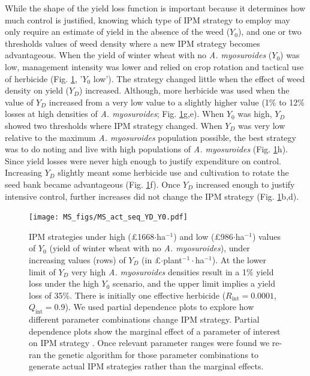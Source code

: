 \documentclass[12pt, a4paper]{article}
\begin{document}
While the shape of the yield loss function is important because it determines how much control is justified, knowing which type of IPM strategy to employ may only require an estimate of yield in the absence of the weed ($Y_0$), and one or two thresholds values of weed density where a new IPM strategy becomes advantageous. When the yield of winter wheat with no \textit{A. myosuroides} ($Y_0$) was low, management intensity was lower and relied on crop rotation and tactical use of herbicide (Fig. \ref{fig:Y0_YD}, '$Y_0$ low'). The strategy changed little when the effect of weed density on yield ($Y_D$) increased. Although, more herbicide was used when the value of $Y_D$ increased from a very low value to a slightly higher value (1\% to 12\% losses at high densities of \textit{A. myosuroides}; Fig. \ref{fig:Y0_YD}g,e). When $Y_0$ was high, $Y_D$ showed two thresholds where IPM strategy changed. When $Y_D$ was very low relative to the maximum \textit{A. myosuroides} population possible, the best strategy was to do noting and live with high populations of \textit{A. myosuroides} (Fig. \ref{fig:Y0_YD}h). Since yield losses were never high enough to justify expenditure on control. Increasing $Y_D$ slightly meant some herbicide use and cultivation to rotate the seed bank became advantageous (Fig. \ref{fig:Y0_YD}f). Once $Y_D$ increased enough to justify intensive control, further increases did not change the IPM strategy (Fig. \ref{fig:Y0_YD}b,d). 
\begin{figure}
	\centering
	\texttt{[image: MS\_figs/MS\_act\_seq\_YD\_Y0.pdf]}
	\caption{IPM strategies under high (\pounds 1668$\cdot$ha$^{-1}$) and low (\pounds 986$\cdot$ha$^{-1}$) values of $Y_0$ (yield of winter wheat with no \textit{A. myosuroides}), under increasing values (rows) of $Y_D$ (in \pounds$\cdot$plant$^{-1}\cdot$ha$^{-1}$). At the lower limit of $Y_D$ very high \textit{A. myosuroides} densities result in a 1\% yield loss under the high $Y_0$ scenario, and the upper limit implies a yield loss of 35\%. There is initially one effective herbicide ($R_\text{int} = 0.0001$, $Q_\text{int} = 0.9$). We used partial dependence plots to explore how different parameter combinations change IPM strategy. Partial dependence plots show the marginal effect of a parameter of interest on IPM strategy \citep{Frie2001, Mill2016}. Once relevant parameter ranges were found we re-ran the genetic algorithm for those parameter combinations to generate actual IPM strategies rather than the marginal effects.}
	\label{fig:Y0_YD} 
\end{figure}
\end{document}
